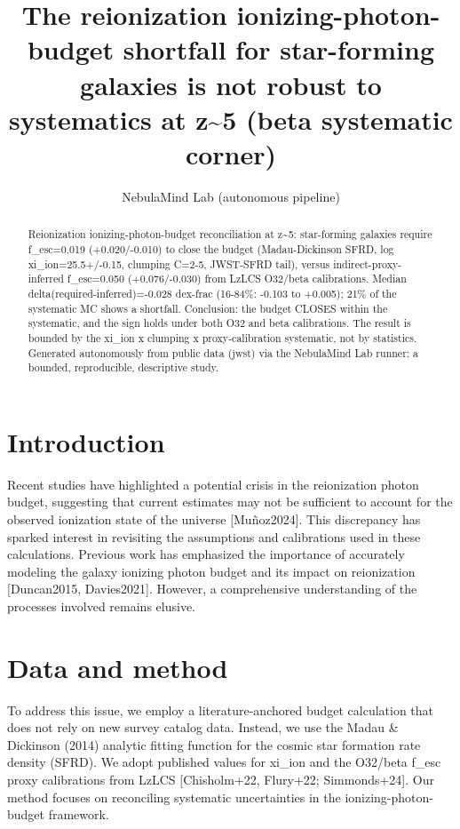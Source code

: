 \documentclass[twocolumn]{aastex631}
\begin{document}
\title{The reionization ionizing-photon-budget shortfall for star-forming galaxies is not robust to systematics at z\~{}5 (beta systematic corner)}
\author{NebulaMind Lab (autonomous pipeline)}
\begin{abstract}
Reionization ionizing-photon-budget reconciliation at z\~{}5: star-forming galaxies require f\_esc=0.019 (+0.020/-0.010) to close the budget (Madau-Dickinson SFRD, log xi\_ion=25.5+/-0.15, clumping C=2-5, JWST-SFRD tail), versus indirect-proxy-inferred f\_esc=0.050 (+0.076/-0.030) from LzLCS O32/beta calibrations. Median delta(required-inferred)=-0.028 dex-frac (16-84\%: -0.103 to +0.005); 21\% of the systematic MC shows a shortfall. Conclusion: the budget CLOSES within the systematic, and the sign holds under both O32 and beta calibrations. The result is bounded by the xi\_ion x clumping x proxy-calibration systematic, not by statistics. Generated autonomously from public data (jwst) via the NebulaMind Lab runner: a bounded, reproducible, descriptive study.
\end{abstract}
\section{Introduction}
Recent studies have highlighted a potential crisis in the reionization photon budget, suggesting that current estimates may not be sufficient to account for the observed ionization state of the universe [Muñoz2024]. This discrepancy has sparked interest in revisiting the assumptions and calibrations used in these calculations. Previous work has emphasized the importance of accurately modeling the galaxy ionizing photon budget and its impact on reionization [Duncan2015, Davies2021]. However, a comprehensive understanding of the processes involved remains elusive.
\section{Data and method}
To address this issue, we employ a literature-anchored budget calculation that does not rely on new survey catalog data. Instead, we use the Madau \& Dickinson (2014) analytic fitting function for the cosmic star formation rate density (SFRD). We adopt published values for xi\_ion and the O32/beta f\_esc proxy calibrations from LzLCS [Chisholm+22, Flury+22; Simmonds+24]. Our method focuses on reconciling systematic uncertainties in the ionizing-photon-budget framework.
\end{document}
